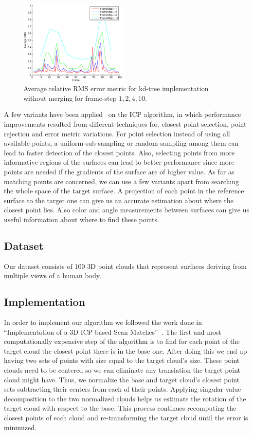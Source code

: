 \begin{figure}[t!]
  \centering
    \includegraphics[width=0.48\textwidth]{figures/RMSunmergedKD.eps}
    \caption{Average relative RMS error metric for kd-tree implementation without merging for frame-step $1,2,4,10$.}
    \label{fig:rmsunmergederror}
\end{figure}

A few variants have been applied~\cite{icpVar} on the ICP algorithm, in which performance improvements resulted from different techniques for, closest point selection, point rejection and error metric variations. For point selection instead of using all available points, a uniform sub-sampling or random sampling among them can lead to faster detection of the closest points. Also, selecting points from more informative regions of the surfaces can lead to better performance since more points are needed if the gradients of the surface are of higher value. As far as matching points are concerned, we can use a few variants apart from searching the whole space of the target surface. A projection of each point in the reference surface to the target one can give us an accurate estimation about where the closest point lies. Also color and angle measurements between surfaces can give us useful information about where to find these points.

\subsection*{Dataset}
Our dataset consists of $100$ 3D point clouds that represent surfaces deriving from multiple views of a human body. 

\subsection{Implementation}
In order to implement our algorithm we followed the work done in ``Implementation of a 3D ICP-based Scan Matches''~\cite{icpImp}. The first and most computationally expensive step of the algorithm is to find for each point of the target cloud the closest point there is in the base one. After doing this we end up having two sets of points with size equal to the target cloud's size. These point clouds need to be centered so we can eliminate any translation the target point cloud might have. Thus, we normalize the base and target cloud's closest point sets subtracting their centers from each of their points. Applying singular value decomposition to the two normalized clouds helps us estimate the rotation of the target cloud with respect to the base. This process continues recomputing the closest points of each cloud and re-transforming the target cloud until the error is minimized.


